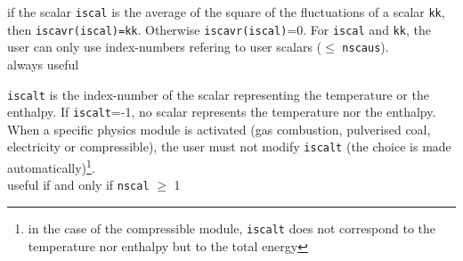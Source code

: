 {if the scalar {\tt iscal} is the average of the square of the fluctuations of a
scalar {\tt kk}, then \mbox{{\tt iscavr(iscal)=kk}}.
Otherwise {\tt iscavr(iscal)}=0. For {\tt iscal} and {\tt kk}, the user
can only use index-numbers refering to user scalars ($\leqslant$ {\tt nscaus}). \\
always useful}

{{\tt iscalt} is the index-number of the scalar
representing the temperature or the enthalpy. If {\tt iscalt}=-1, no
scalar represents the temperature nor the enthalpy. When a specific
physics module is activated (gas combustion, pulverised coal,
electricity or compressible),
the user must not modify {\tt iscalt} (the choice is made
automatically)\footnote{in the case of the compressible module, {\tt iscalt}
does not correspond to the temperature nor enthalpy but to the total energy}.\\
useful if and only if {\tt nscal} $\geqslant$ 1}

